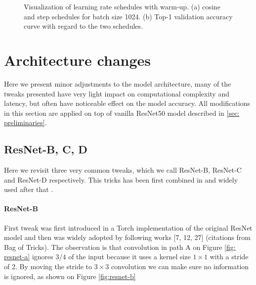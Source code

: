 \begin{figure}[t!]
  \centering
  \caption{Visualization of learning rate schedules with warm-up. (a) cosine and step schedules for batch size 1024. (b) Top-1 validation accuracy curve with regard to the two schedules.}
  \label{fig:learning-rate-curve}
\end{figure}







\section{Architecture changes}

Here we present minor adjustments to the model architecture, many of the tweaks presented have very light impact on computational complexity and latency, but often have noticeable effect on the model accuracy. All modifications in this section are applied on top of vanilla ResNet50 model described in \ref{sec: preliminaries}.

\subsection{ResNet-B, C, D}
Here we revisit three very common tweaks, which we call ResNet-B, ResNet-C and ResNet-D respectively. This tricks has been first combined in \cite{he2019_bag_of_tricks} and widely used after that \cite{ridnik2021_tresnet} \cite{bello2021_revisiting_resnet}. 

\paragraph{ResNet-B}
First tweak was first introduced in a Torch implementation of the original ResNet model and then was widely adopted by following works [7, 12, 27] (citations from Bag of Tricks). The observation is that convolution in path A on Figure \ref{fig: resnet-a} ignores $3/4$ of the input because it uses a kernel size $1 \times 1$ with a stride of 2. By moving the stride to $3 \times 3$ convolution we can make sure no information is ignored, as shown on Figure \ref{fig:resnet-b}

